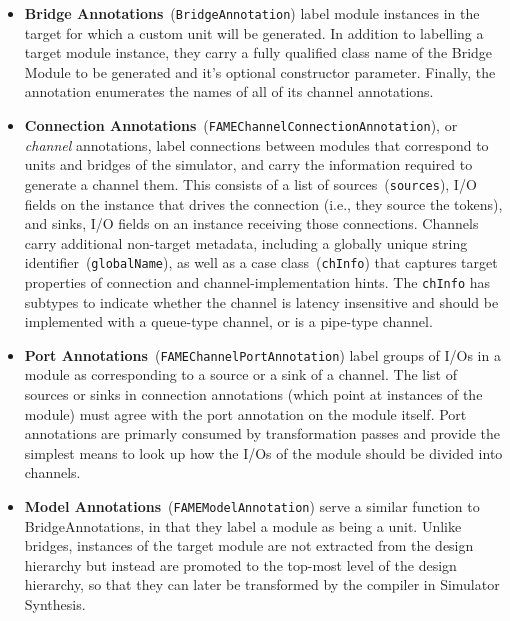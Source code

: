 \begin{itemize}
    \item \textbf{Bridge Annotations}~(\texttt{BridgeAnnotation}) label module
        instances in the target for which a custom unit will be generated.  In
        addition to labelling a target module instance, they carry a fully qualified
        class name of the Bridge Module to be generated and it's optional
        constructor parameter. Finally, the annotation enumerates the names of all
        of its channel annotations.

\item \textbf{Connection Annotations}~(\texttt{FAMEChannelConnectionAnnotation}), or \emph{channel} annotations, label connections between modules that correspond to units and bridges of the simulator, and
    carry the information required to generate a channel them. This consists of
    a list of sources~(\texttt{sources}), I/O fields on the instance that drives the connection
    (i.e., they source the tokens), and sinks, I/O fields on an instance
    receiving those connections. Channels carry additional non-target metadata,
    including a globally unique string identifier~(\texttt{globalName}), as well as a case class~(\texttt{chInfo}) that
    captures target properties of connection and channel-implementation hints.
    The \texttt{chInfo} has subtypes to indicate whether the channel is latency
    insensitive and should be implemented with a queue-type channel, or is a pipe-type channel.

\item \textbf{Port Annotations}~(\texttt{FAMEChannelPortAnnotation}) label groups of I/Os in a module as corresponding to a source or a sink of a
    channel. The list of sources or sinks in connection annotations (which point
    at instances of the module) must agree with the port annotation on the
    module itself. Port annotations are primarly consumed by transformation passes and provide the simplest means
    to look up how the I/Os of the module should be divided into channels.

\item \textbf{Model Annotations}~(\texttt{FAMEModelAnnotation}) serve a similar function to BridgeAnnotations, in that they label a
    module as being a unit. Unlike bridges, instances of the target module
    are not extracted from the design hierarchy but instead are promoted to
    the top-most level of the design hierarchy, so that they can later be
    transformed by the compiler in Simulator Synthesis.
\end{itemize}

